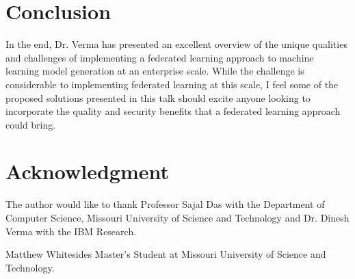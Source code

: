 \documentclass[journal,onecolumn]{IEEEtran}
\begin{document}
\section{Conclusion}

In the end, Dr. Verma has presented an excellent overview of the unique qualities and challenges of implementing a federated learning approach to machine learning model generation at an enterprise scale. While the challenge is considerable to implementing federated learning at this scale, I feel some of the proposed solutions presented in this talk should excite anyone looking to incorporate the quality and security benefits that a federated learning approach could bring. 




\section*{Acknowledgment}
The author would like to thank Professor Sajal Das with the Department of Computer Science, Missouri University of Science and Technology and Dr. Dinesh Verma with the IBM Research.

\ifCLASSOPTIONcaptionsoff
  \newpage
\fi




\begin{IEEEbiographynophoto}{Matthew Whitesides}
  Master's Student at Missouri University of Science and Technology.
\end{IEEEbiographynophoto}

\end{document}
